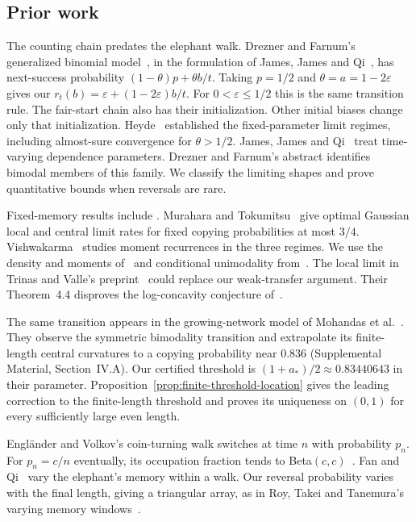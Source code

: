 \subsection{Prior work}\label{sec:prior}

The counting chain predates the elephant walk. Drezner and Farnum's
generalized binomial model~\cite{dreznerfarnum1993}, in the formulation
of James, James and Qi~\cite[p.~2339]{jamesjamesqi2008}, has next-success
probability $(1-\theta)p+\theta b/t$. Taking $p=1/2$ and
$\theta=a=1-2\varepsilon$ gives our $r_t(b)=\varepsilon+(1-2\varepsilon)b/t$.
For $0<\varepsilon\le1/2$ this is the same transition rule.
The fair-start chain also has their initialization. Other initial biases change only that
initialization. Heyde~\cite{heyde2004} established the fixed-parameter limit
regimes, including almost-sure convergence for $\theta>1/2$.
James, James and Qi~\cite[Theorem~2.2]{jamesjamesqi2008} treat time-varying
dependence parameters. Drezner and Farnum's abstract identifies bimodal members of this
family. We classify the limiting shapes and prove quantitative bounds
when reversals are rare.

Fixed-memory results include
\cite{coletti2017,bercu2018,kubotatakei2019}. Murahara and
Tokumitsu~\cite{muraharatokumitsu2026} give optimal Gaussian local and central limit rates for fixed copying
probabilities at most $3/4$. Vishwakarma~\cite{vishwakarma2026} studies moment recurrences in the three
regimes. We use the density and moments
of~\cite[Theorems~1.3 and~1.4]{glr2026} and conditional unimodality
from~\cite[Theorem~1.1]{glrs2025}. The local limit in Trinas and Valle's
preprint~\cite[Theorem~3.1]{tv2026} could replace our weak-transfer
argument. Their Theorem~4.4 disproves the log-concavity conjecture
of~\cite[Remark~2.3]{glrs2025}.

The same transition appears in the growing-network model of
Mohandas et al.~\cite{mohandas2025}. They observe the symmetric
bimodality transition and extrapolate its finite-length central
curvatures to a copying probability near $0.836$
(Supplemental Material, Section~IV.A).
Our certified threshold is $(1+a_*)/2\approx0.83440643$ in their
parameter. Proposition~\ref{prop:finite-threshold-location} gives
the leading correction to the finite-length threshold and proves
its uniqueness on $(0,1)$ for every sufficiently large even length.

Engl\"ander and Volkov's coin-turning walk switches at time $n$ with
probability $p_n$. For $p_n=c/n$ eventually, its occupation fraction tends
to Beta$(c,c)$~\cite[Section~4, Theorem~1]{ev2018}. Fan and
Qi~\cite{fanqi2026} vary the elephant's memory within a walk. Our reversal
probability varies with the final length, giving a triangular array,
as in Roy, Takei and Tanemura's varying memory windows~\cite{rtt2025}.

